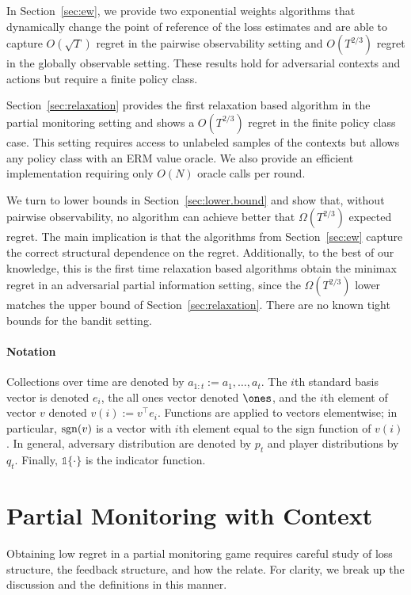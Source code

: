 \documentclass{article}
\begin{document}
In Section~\ref{sec:ew}, we provide two exponential weights algorithms that dynamically change the point of reference of the loss estimates and are able to capture $O(\sqrt{T})$ regret in the pairwise observability setting and $O(T^{2/3})$ regret in the globally observable setting. These results hold for adversarial contexts and actions but require a finite policy class.

Section~\ref{sec:relaxation} provides the first relaxation based algorithm in the partial monitoring setting and shows a $O(T^{2/3})$ regret in the finite policy class case. This setting requires access to unlabeled samples of the contexts but allows any policy class with an ERM value oracle. We also provide an efficient implementation requiring only $O(N)$  oracle calls per round.

We turn to lower bounds in Section~\ref{sec:lower.bound} and show that, without pairwise observability, no algorithm can achieve better that $\Omega(T^{2/3})$ expected regret. The main implication is that the algorithms from Section~\ref{sec:ew} capture the correct structural dependence on the regret. Additionally, to the best of our knowledge, this is the first time relaxation based algorithms obtain the minimax regret in an adversarial partial information setting, since the $\Omega(T^{2/3})$ lower matches the upper bound of Section~\ref{sec:relaxation}. There are no known tight bounds for the bandit setting.

\paragraph{Notation}
Collections over time are denoted by $a_{1:t} := a_1,\ldots, a_t $. The $i$th standard basis vector is denoted $e_i$, the all ones vector denoted $\ones$, and the $i$th element of vector $v$ denoted $v(i):= v^\top e_i$. Functions are applied to vectors elementwise; in particular, $\operatorname*{sgn}(v)$ is a vector with $i$th element equal to the sign function of $v(i)$. In general, adversary distribution are denoted by $p_t$ and player distributions by $q_t$. Finally,  $\mathds{1}\{\cdot\}$ is the indicator function.

\section{Partial Monitoring with Context}
Obtaining low regret in a partial monitoring game requires careful study of loss structure, the feedback structure, and how the relate. For clarity, we break up the discussion and the definitions in this manner.
\end{document}
